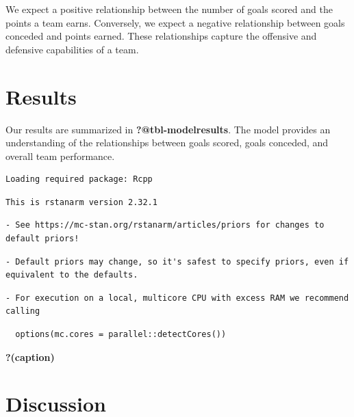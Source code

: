 \documentclass[
  letterpaper,
  DIV=11,
  numbers=noendperiod]{scrartcl}
\begin{document}
We expect a positive relationship between the number of goals scored and
the points a team earns. Conversely, we expect a negative relationship
between goals conceded and points earned. These relationships capture
the offensive and defensive capabilities of a team.

\hypertarget{sec-results}{%
\section{Results}\label{sec-results}}

Our results are summarized in \textbf{?@tbl-modelresults}. The model
provides an understanding of the relationships between goals scored,
goals conceded, and overall team performance.

\begin{verbatim}
Loading required package: Rcpp
\end{verbatim}

\begin{verbatim}
This is rstanarm version 2.32.1
\end{verbatim}

\begin{verbatim}
- See https://mc-stan.org/rstanarm/articles/priors for changes to default priors!
\end{verbatim}

\begin{verbatim}
- Default priors may change, so it's safest to specify priors, even if equivalent to the defaults.
\end{verbatim}

\begin{verbatim}
- For execution on a local, multicore CPU with excess RAM we recommend calling
\end{verbatim}

\begin{verbatim}
  options(mc.cores = parallel::detectCores())
\end{verbatim}

\begin{table}

\caption{\textbf{?(caption)}}

\end{table}

\hypertarget{discussion}{%
\section{Discussion}\label{discussion}}
\end{document}

